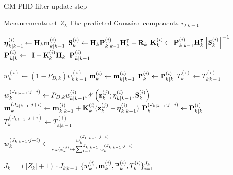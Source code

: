\begin{algorithm}
\caption{GM-PHD filter update step}\label{alg:gm-phd:update}
\begin{algorithmic}[1]
    \Require Measurements set $Z_k$
    \Require The predicted Gaussian components $v_{k|k-1}$
    \item[]

         
            \State $\boldsymbol{\eta}_{k|k-1}^{(i)} \gets \vecat{H}{k} \vecat{m}{k|k-1}^{(i)}$
            \State $\svecat{S}{k}{(i)} \gets \vecat{H}{k}\vecat{P}{k|k-1}^{(i)} \vecat{H}{k}^\intercal + \vecat{R}{k}$
            \State $\vecat{K}{k}^{(i)} \gets \vecat{P}{k|k-1}^{(i)} \vecat{H}{k}^\intercal \left[\svecat{S}{k}{(i)}\right]^{-1}$
            \State $\svecat{P}{k|k}{(i)} \gets \left[ \mathbf{I} - \vecat{K}{k}^{(i)}\vecat{H}{k} \right] \vecat{P}{k|k-1}^{(i)}$
        \EndFor

         
            \State $w_{k}^{(i)} \gets (1 - P_{D,k})w_{k|k-1}^{(i)}$
            \State $\vecat{m}{k}^{(i)} \gets \vecat{m}{k|k-1}^{(i)}$
            \State $\vecat{P}{k}^{(i)} \gets \vecat{P}{k|k}^{(i)}$
            \State $T_{k}^{(i)} \gets T_{k|k-1}^{(i)}$
        \EndFor

         
                \State $w_{k}^{(J_{k|k-1}\cdot j + i)} \gets P_{D,k} w_{k|k-1}^{(i)} \mathscr{N}\left(\svecat{z}{k}{(j)}; \boldsymbol{\eta}_{k|k-1}^{(i)}, \svecat{S}{k}{(i)} \right)$
                \State $\svecat{m}{k}{(J_{k|k-1}\cdot j + i)} \gets \svecat{m}{k|k-1}{(i)} + \vecat{K}{k}^{(i)} (\svecat{z}{k}{(j)} - \boldsymbol{\eta}_{k|k-1}^{(i)})$
                \State $\svecat{P}{k}{(J_{k|k-1}\cdot j + i)} \gets \svecat{P}{k|k}{(i)}$
                \State $T_{k}^{(J_{k|k-1}\cdot j + i)} \gets T_{k|k-1}^{(i)}$
            \EndFor

             
                \State $w_{k}^{(J_{k|k-1}\cdot j + i)} \gets \frac{w_{k}^{(J_{k|k-1}\cdot j + i)}}{
                    \kappa_{k}(\svecat{z}{k}{(j)}) + \sum_{l=1}^{J_{k|k-1}} w_{k}^{(J_{k|k-1}\cdot j + i)}
                }$
            \EndFor
        \EndFor

        \State $J_k = (|Z_k| + 1) \cdot J_{k|k-1}$
        \State \Return $\{ w_{k}^{(i)}, \vecat{m}{k}^{(i)}, \vecat{P}{k}^{(i)}, T_{k}^{(i)}\}_{i=1}^{J_{k}}$
    \EndProcedure
\end{algorithmic}
\end{algorithm}

